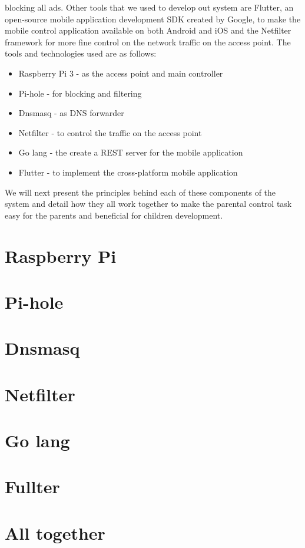 blocking all ads. Other tools that we used to develop out system are Flutter, an open-source mobile application development SDK created by Google, to make the mobile control application available on both Android and iOS and the Netfilter framework for more fine control on the network traffic on the access point. The tools and technologies used are as follows:

\begin{itemize}
\item Raspberry Pi 3 - as the access point and main controller
\item Pi-hole - for blocking and filtering
\item Dnsmasq - as DNS forwarder
\item Netfilter - to control the traffic on the access point
\item Go lang - the create a REST server for the mobile application
\item Flutter - to implement the cross-platform mobile application
\end{itemize}

We will next present the principles behind each of these components of the system and detail how they all work together to make the parental control task easy for the parents and beneficial for children development.

\section{Raspberry Pi}

\section{Pi-hole}

\section{Dnsmasq}

\section{Netfilter}

\section{Go lang}

\section{Fullter}

\section{All together}

